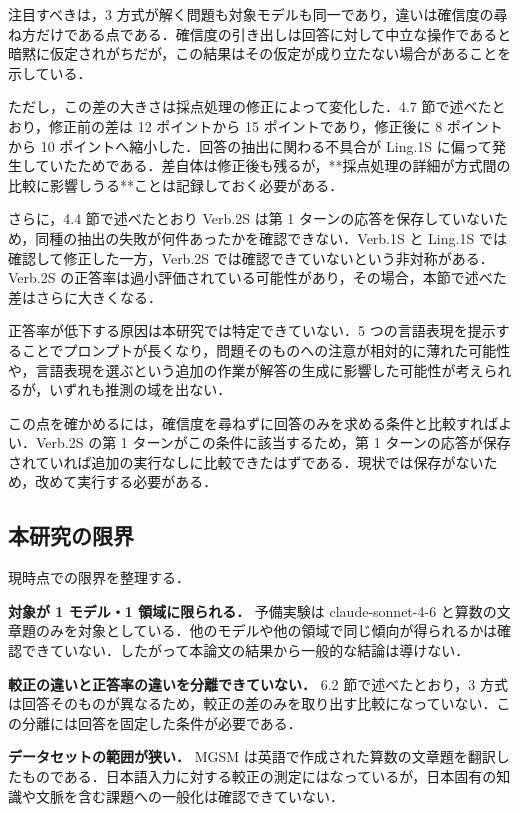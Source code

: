 注目すべきは，3 方式が解く問題も対象モデルも同一であり，違いは確信度の尋ね方だけである点である．確信度の引き出しは回答に対して中立な操作であると暗黙に仮定されがちだが，この結果はその仮定が成り立たない場合があることを示している．

ただし，この差の大きさは採点処理の修正によって変化した．4.7 節で述べたとおり，修正前の差は 12 ポイントから 15 ポイントであり，修正後に 8 ポイントから 10 ポイントへ縮小した．回答の抽出に関わる不具合が Ling.1S に偏って発生していたためである．差自体は修正後も残るが，**採点処理の詳細が方式間の比較に影響しうる**ことは記録しておく必要がある．

さらに，4.4 節で述べたとおり Verb.2S は第 1 ターンの応答を保存していないため，同種の抽出の失敗が何件あったかを確認できない．Verb.1S と Ling.1S では確認して修正した一方，Verb.2S では確認できていないという非対称がある．Verb.2S の正答率は過小評価されている可能性があり，その場合，本節で述べた差はさらに大きくなる．

正答率が低下する原因は本研究では特定できていない．5 つの言語表現を提示することでプロンプトが長くなり，問題そのものへの注意が相対的に薄れた可能性や，言語表現を選ぶという追加の作業が解答の生成に影響した可能性が考えられるが，いずれも推測の域を出ない．

この点を確かめるには，確信度を尋ねずに回答のみを求める条件と比較すればよい．Verb.2S の第 1 ターンがこの条件に該当するため，第 1 ターンの応答が保存されていれば追加の実行なしに比較できたはずである．現状では保存がないため，改めて実行する必要がある．

\subsection{本研究の限界}

現時点での限界を整理する．

\textbf{対象が 1 モデル・1 領域に限られる．} 予備実験は claude-sonnet-4-6 と算数の文章題のみを対象としている．他のモデルや他の領域で同じ傾向が得られるかは確認できていない．したがって本論文の結果から一般的な結論は導けない．

\textbf{較正の違いと正答率の違いを分離できていない．} 6.2 節で述べたとおり，3 方式は回答そのものが異なるため，較正の差のみを取り出す比較になっていない．この分離には回答を固定した条件が必要である．

\textbf{データセットの範囲が狭い．} MGSM は英語で作成された算数の文章題を翻訳したものである．日本語入力に対する較正の測定にはなっているが，日本固有の知識や文脈を含む課題への一般化は確認できていない．

